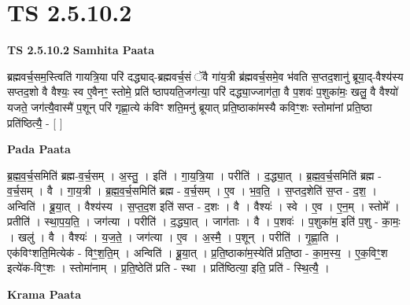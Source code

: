 \documentclass[17pt]{extarticle}
\begin{document}
\section*{ TS 2.5.10.2 }

\textbf{TS 2.5.10.2 } \newline
\textbf{Samhita Paata} \newline

ब्रह्मवर्च॒सम॒स्त्विति॑ गायत्रि॒या परि॑ दद्ध्याद्-ब्रह्मवर्च॒सं ॅवै गा॑य॒त्री ब्र॑ह्मवर्च॒समे॒व भ॑वति स॒प्तद॒शानु॑ ब्रूया॒द्-वैश्य॑स्य सप्तद॒शो वै वैश्यः॒ स्व ए॒वैनꣳ॒॒ स्तोमे॒ प्रति॑ ष्ठापयति॒जग॑त्या॒ परि॑ दद्ध्या॒ज्जाग॑ता॒ वै प॒शवः॑ प॒शुका॑मः॒ खलु॒ वै वैश्यो॑ यजते॒ जग॑त्यै॒वास्मै॑ प॒शून् परि॑ गृह्णा॒त्ये क॑विꣳ शति॒मनु॑ ब्रूयात् प्रति॒ष्ठाका॑मस्यै कविꣳ॒॒शः स्तोमा॑नां प्रति॒ष्ठा प्रति॑ष्ठित्यै॒ - [  ] \newline

\textbf{Pada Paata} \newline

ब्र॒ह्म॒व॒र्च॒समिति॑ ब्रह्म-व॒र्च॒सम् । अ॒स्तु॒ । इति॑ । गा॒य॒त्रि॒या । परीति॑ । द॒द्ध्या॒त् । ब्र॒ह्म॒व॒र्च॒समिति॑ ब्रह्म - व॒र्च॒सम् । वै । गा॒य॒त्री । ब्र॒ह्म॒व॒र्च॒समिति॑ ब्रह्म - व॒र्च॒सम् । ए॒व । भ॒व॒ति॒ । स॒प्तद॒शेति॑ स॒प्त - द॒श॒ । अन्विति॑ । ब्रू॒या॒त् । वैश्य॑स्य । स॒प्त॒द॒श इति॑ सप्त - द॒शः । वै । वैश्यः॑ । स्वे । ए॒व । ए॒न॒म् । स्तोमे᳚ । प्रतीति॑ । स्था॒प॒य॒ति॒ । जग॑त्या । परीति॑ । द॒द्ध्या॒त् । जाग॑ताः । वै । प॒शवः॑ । प॒शुका॑म॒ इति॑ प॒शु - का॒मः॒ । खलु॑ । वै । वैश्यः॑ । य॒ज॒ते॒ । जग॑त्या । ए॒व । अ॒स्मै॒ । प॒शून् । परीति॑ । गृ॒ह्णा॒ति । एक॑विꣳशति॒मित्येक॑ - विꣳ॒॒श॒ति॒म् । अन्विति॑ । ब्रू॒या॒त् । प्र॒ति॒ष्ठाका॑म॒स्येति॑ प्रति॒ष्ठा - का॒म॒स्य॒ । ए॒क॒विꣳ॒॒श इत्ये॑क-विꣳ॒॒शः । स्तोमा॑नाम् । प्र॒ति॒ष्ठेति॑ प्रति - स्था । प्रति॑ष्ठित्या॒ इति॒ प्रति॑ - स्थि॒त्यै॒ ।  \newline


\textbf{Krama Paata} \newline
\end{document}

